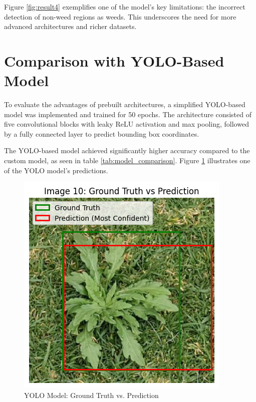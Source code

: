 \documentclass[conference]{IEEEtran}
\begin{document}
Figure \ref{fig:result4} exemplifies one of the model's key limitations: the incorrect detection of non-weed regions as weeds. This underscores the need for more advanced architectures and richer datasets.

\section{Comparison with YOLO-Based Model}
To evaluate the advantages of prebuilt architectures, a simplified YOLO-based model was implemented and trained for 50 epochs. The architecture consisted of five convolutional blocks with leaky ReLU activation and max pooling, followed by a fully connected layer to predict bounding box coordinates. 

The YOLO-based model achieved significantly higher accuracy compared to the custom model, as seen in table \ref{tab:model_comparison}. Figure \ref{fig:yolo_result1} illustrates one of the YOLO model's predictions.

\begin{figure}[H]
    \centering
    \includegraphics[width=\columnwidth]{result_yolo1.png}
    \caption{YOLO Model: Ground Truth vs. Prediction}
    \label{fig:yolo_result1}
\end{figure}
\end{document}
